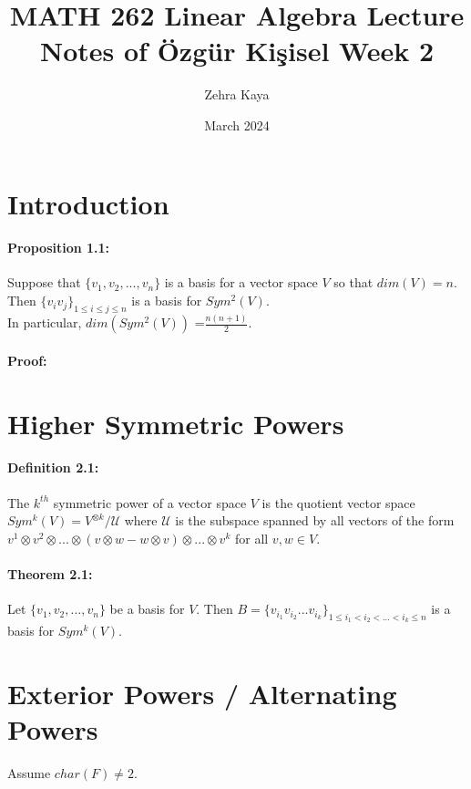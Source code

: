 \documentclass{article}
\title{MATH 262 Linear Algebra
Lecture Notes of Özgür Kişisel Week 2}
\author{Zehra Kaya}
\date{March 2024}
\begin{document}
\maketitle
\tableofcontents


\section{Introduction}


\paragraph{Proposition 1.1:} Suppose that $\{v_1,v_2,...,v_n\}$ is a basis for a vector space $V$ so that  $dim(V)=n $. 
Then $\{v_iv_j\}_{1\leq i\leq j\leq n}$ is a basis for $Sym^2(V)$.\\

In particular,  $dim(Sym^2(V))$ =$\frac{n(n+1)}{2}$.

\paragraph{Proof:} 
\section{Higher Symmetric Powers}
\paragraph{Definition 2.1:} The $k^{th}$ symmetric power of a vector space $V$ is the quotient vector space $Sym^k(V) = V^{\otimes k}/\mathcal{U}$ where $\mathcal{U}$ is the subspace spanned by all vectors of the form $v^1\otimes v^2\otimes...\otimes( v\otimes w-w\otimes v) \otimes...\otimes v^k$ for all $v,w\in V$.

\paragraph{Theorem 2.1:} Let $\{v_1,v_2,...,v_n\}$ be a basis for $V$. Then $B= \{v_{i_1}v_{i_2}...v_{i_k}\}_{1\leq i_1< i_2<...< i_k\leq n}$ is a basis for $Sym^k(V)$.\\




\section{Exterior Powers / Alternating Powers}
Assume $char(F)\neq 2$.\\
\end{document}
